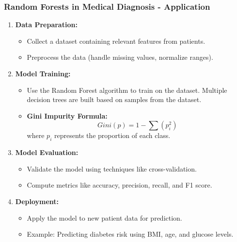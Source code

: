 \documentclass[aspectratio=169]{beamer}
\begin{document}
\begin{frame}[fragile]
    \frametitle{Random Forests in Medical Diagnosis - Application}
    \begin{enumerate}
        \item \textbf{Data Preparation:}
            \begin{itemize}
                \item Collect a dataset containing relevant features from patients.
                \item Preprocess the data (handle missing values, normalize ranges).
            \end{itemize}
        
        \item \textbf{Model Training:}
            \begin{itemize}
                \item Use the Random Forest algorithm to train on the dataset. Multiple decision trees are built based on samples from the dataset.
                \item \textbf{Gini Impurity Formula:}
                \begin{equation}
                Gini(p) = 1 - \sum (p_i^2)
                \end{equation}
                where \( p_i \) represents the proportion of each class.
            \end{itemize}

        \item \textbf{Model Evaluation:}
            \begin{itemize}
                \item Validate the model using techniques like cross-validation.
                \item Compute metrics like accuracy, precision, recall, and F1 score.
            \end{itemize}

        \item \textbf{Deployment:}
            \begin{itemize}
                \item Apply the model to new patient data for prediction.
                \item Example: Predicting diabetes risk using BMI, age, and glucose levels.
            \end{itemize}
    \end{enumerate}
\end{frame}
\end{document}
